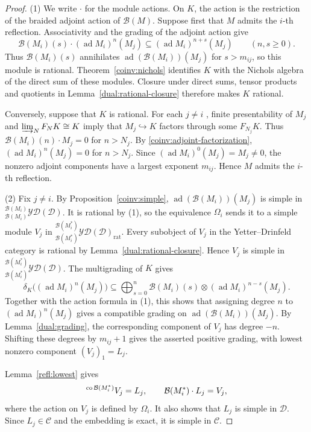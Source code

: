 \documentclass[11pt, a4paper]{article}
\numberwithin{equation}{section}
\newcommand{\C}{\mathcal C}
\newcommand{\D}{\mathcal D}
\newcommand{\B}{\mathcal B}
\newcommand{\YD}{\mathcal{YD}}
\DeclareMathOperator{\ad}{ad}
\DeclareMathOperator{\co}{co}
\newcommand{\rat}{\mathrm{rat}}
\begin{document}
\begin{proof}
\textup{(1)}
We write $\cdot$ for the module actions.
On $K$, the action is the restriction of the braided
adjoint action of $\B(M)$.
Suppose first that $M$ {admits the $i$-th reflection}.
 {Associativity and the} grading  {of the adjoint action give}
\[
 \B(M_i)(s)\cdot(\ad M_i)^{{n}}(M_j)
 \subseteq(\ad M_i)^{{{n}}+s}(M_j)
 \qquad({{n}},s\geq0).
\]
 {Thus} $\B(M_i)(s)$ annihilates $\ad(\B(M_i))(M_j)$ for
$s>m_{ij}$, so this module is rational.
Theorem~\ref{coinv:nichols}  {identifies} $K$  {with} the Nichols algebra
of the direct sum of these modules.
 {Closure} under direct sums, tensor products and quotients
 { in Lemma~\ref{dual:rational-closure} therefore makes} $K$ rational.

Conversely, suppose that $K$ is rational.
 {For each} $  j\neq i   $ {, finite presentability of} $M_j$  {and}
$  \varinjlim_NF_NK\cong K   $  {imply that}
$M_j\hookrightarrow K$ factors through some $F_{N_j}K$.
 {Thus} $\B(M_i)({{n}})\cdot M_j=0$  {for} ${{n}}>N_j$.
 { By \eqref{coinv:adjoint-factorization},}
$(\ad M_i)^{{n}}(M_j)  =0   $ for ${{n}}>N_j$.
Since $(\ad M_i)^0(M_j)=M_j\neq0$,  {the nonzero adjoint
components have} a largest  {exponent} $m_{ij}$.
Hence $M$ {admits the $i$-th reflection}.

\textup{(2)}
Fix $j\neq i$.
By Proposition~\ref{coinv:simple},
$\ad(\B(M_i))(M_j)$ is simple in
${}_{\B(M_i)}^{\B(M_i)}\YD(\D)$.
It is rational by \textup{(1)}, so  {the equivalence} $\Omega_i$
sends it to a simple module $V_j$ in
${}_{\B(M_i^*)}^{\B(M_i^*)}\YD(\D)_{\rat}$.
 {Every subobject of} $  V_j   $  {in the  Yetter--Drinfeld category
is} rational by Lemma~\ref{dual:rational-closure}.
 {Hence} $V_j$ is simple in
${}_{\B(M_i^*)}^{\B(M_i^*)}\YD(\D)$.
The multigrading of $K$ gives
\[
 \delta_K\bigl((\ad M_i)^{{n}}(M_j)\bigr)
 \subseteq
 \bigoplus_{s=0}^{{{n}}}
 \B(M_i)(s)\otimes(\ad M_i)^{{{n}}-s}(M_j).
\]
Together with the action formula in \textup{(1)},
this shows that assigning degree ${{n}}$ to
$(\ad M_i)^{{n}}(M_j)$ gives a compatible grading on
$\ad(\B(M_i))(M_j)$.
By Lemma~\ref{dual:grading}, the corresponding component
of $V_j$ has degree $-{{n}}$.
Shifting these degrees by $m_{ij}+1$ gives the asserted
positive grading, with lowest nonzero component
$(V_j)_1=L_j$.

Lemma~\ref{refl:lowest} gives
\[
 \prescript{\co\B(M_i^*)}{}{V_j}=L_j,
 \qquad
 \B(M_i^*)\cdot L_j=V_j,
\]
where the action on $V_j$ is defined by $\Omega_i$.
 {It also} shows that $L_j$ is simple in $\D$.
Since $L_j\in\C$  {and the embedding is exact}, it is simple in $\C$.

\end{proof}
\end{document}
